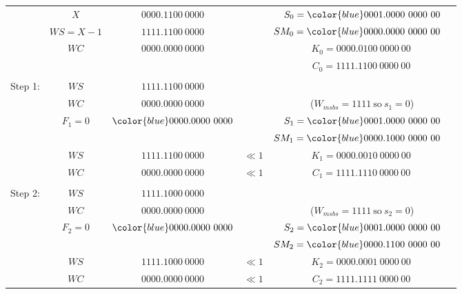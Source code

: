 \documentclass[12pt]{article}
\begin{document}
{\small
\begin{center}
\begin{tabular}{ccccc}
            &$X             $&$         0000.1100\ 0000     $&          &$S_0={\color{blue}0001}.0000\ 0000\ 00$\\
            &$WS=X-1        $&$         1111.1100\ 0000     $&          &$SM_0={\color{blue}0000}.0000\ 0000\ 00\phantom{M}$\\
            &$WC            $&$         0000.0000\ 0000     $&          &$K_0=0000.0100\ 0000\ 00\ $\\
            &                &                               &          &$C_0=1111.1100\ 0000\ 00\,$\\
    \hdashline\\
    Step 1: &$WS            $&$         1111.1100\ 0000     $&          &\\
            &$WC            $&$         0000.0000\ 0000     $&          &($W_{msbs}=1111\ \text{so}\ s_1=0$)\\
            &$F_1=0         $&${\color{blue}0000.00}00\ 0000$&          &$S_1={\color{blue}0001.0}000\ 0000\ 00$\\
            &                &                               &          &$SM_1={\color{blue}0000.1}000\ 0000\ 00\phantom{M}$\\
    \cline{2-3}
            &$WS            $&$         1111.1100\ 0000     $&$\ll1    $&$K_1=0000.0010\ 0000\ 00\ $\\
            &$WC            $&$         0000.0000\ 0000     $&$\ll1    $&$C_1=1111.1110\ 0000\ 00\,$\\
    \hdashline\\    
    Step 2: &$WS            $&$         1111.1000\ 0000     $&          &\\
            &$WC            $&$         0000.0000\ 0000     $&          &($W_{msbs}=1111\ \text{so}\ s_2=0$)\\
            &$F_2=0         $&${\color{blue}0000.000}0\ 0000$&          &$S_2={\color{blue}0001.00}00\ 0000\ 00$\\
            &                &                               &          &$SM_2={\color{blue}0000.11}00\ 0000\ 00\phantom{M}$\\
    \cline{2-3}
            &$WS            $&$         1111.1000\ 0000     $&$\ll1    $&$K_2=0000.0001\ 0000\ 00\ $\\
            &$WC            $&$         0000.0000\ 0000     $&$\ll1    $&$C_2=1111.1111\ 0000\ 00\,$\\

\end{tabular}
\end{center}}
\end{document}
